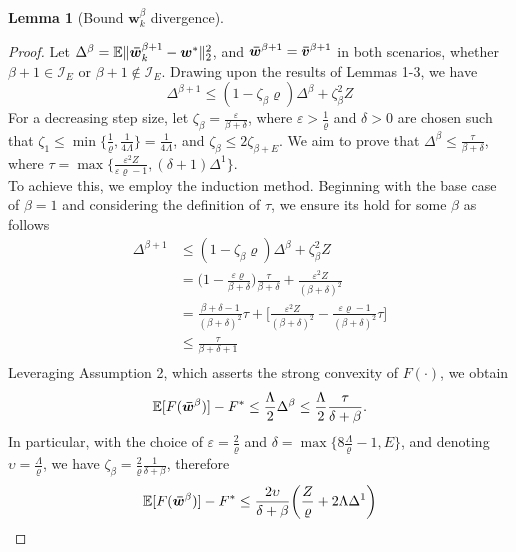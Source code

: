 \documentclass[letter,journal]{IEEEtran}
\newtheorem{lemma}{Lemma}
\begin{document}
\begin{appendices}
\begin{lemma}[Bound $\boldsymbol{{w}}^{\beta}_{k}$ divergence]
\end{lemma}
\begin{proof}
Let $\Delta^\beta=\mathbb{E}\|\boldsymbol{\Bar {w}}^{\beta+1}_{k}-\boldsymbol{{w}}^*\|^2_2$, and $\boldsymbol{\Bar {w}}^{\beta+1}=\boldsymbol{\Bar {v}}^{\beta+1}$ in both scenarios, whether $\beta+1\in \mathcal{I}_E$ or $\beta+1 \notin \mathcal{I}_E$. Drawing upon the results of Lemmas 1-3, we have
\begin{equation}
    \Delta^{\beta+1}\leq(1-\zeta_{{\beta}} \varrho)\Delta^{\beta}+\zeta_{{\beta}}^2 Z
\end{equation}
For a decreasing step size, let $\zeta_{\beta}=\frac{\varepsilon}{\beta+ \delta}$, where $\varepsilon>\frac{1}{\varrho}$ and $\delta>0$ are chosen such that $\zeta_{1}\leq \min\{\frac{1}{\varrho}, \frac{1}{4\Lambda}\}=\frac{1}{4\Lambda}$, and $\zeta_{\beta}\leq 2\zeta_{\beta+E}$. We aim to prove that $\Delta^\beta\leq\frac{\tau}{\beta+\delta}$, where $\tau=\max\{\frac{\varepsilon^2 Z}{\varepsilon \varrho-1}, (\delta+1)\Delta^{1}\}$. \\
To achieve this, we employ the induction method. Beginning with the base case of $\beta = 1$ and considering the definition of $\tau$, we ensure its hold  for some $\beta$ as follows
\begin{align}\nonumber
    \Delta^{\beta+1}&\leq(1-\zeta_{\beta}\varrho)\Delta^{\beta}+\zeta_{\beta}^2 Z \\\nonumber
    &=\biggl(1-\frac{\varepsilon\varrho}{\beta+\delta}\biggl)\frac{\tau}{\beta+\delta}+\frac{\varepsilon^2Z}{(\beta+\delta)^2}\\\nonumber
    &=\frac{\beta+\delta-1}{(\beta+\delta)^2}\tau+\biggl[\frac{\varepsilon^2Z}{(\beta+\delta)^2}-\frac{\varepsilon\varrho-1}{(\beta+\delta)^2}\tau\biggl]\\\nonumber
    &\leq\frac{\tau}{\beta+\delta+1}\\\nonumber
\end{align}
Leveraging Assumption 2, which asserts the strong convexity of $F(\cdot)$, we obtain
$$\mathbb{E}[F(\boldsymbol{\Bar w}^{\beta})]-F^*\leq \frac{\Lambda}{2}\Delta^{\beta}\leq\frac{\Lambda}{2}\frac{\tau}{\delta+\beta}.
$$
In particular, with the choice of $\varepsilon=\frac{2}{\varrho}$ and $\delta=\max\{8\frac{\Lambda}{\varrho}-1, E\}$, and denoting $\upsilon=\frac{\Lambda}{\varrho}$, we have $\zeta_{\beta}=\frac{2}{\varrho}\frac{1}{\delta+\beta}$, therefore
$$\mathbb{E}[F(\boldsymbol{\Bar w}^{\beta})]-F^*\leq\frac{2\upsilon}{\delta+\beta}\biggl(\frac{Z}{\varrho}+2\Lambda\Delta^{1}\biggl)$$
\end{proof}\vspace{-0.9cm}
\end{appendices}
\end{document}
